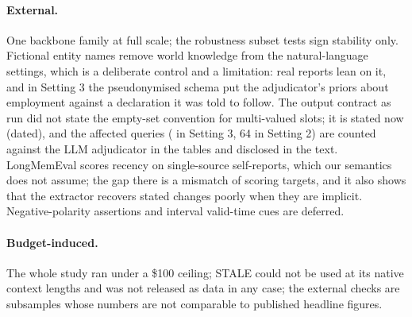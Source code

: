 \paragraph{External.} One backbone family at full scale; the robustness subset tests sign stability only. Fictional entity names remove world knowledge from the natural-language settings, which is a deliberate control and a limitation: real reports lean on it, and in Setting 3 the pseudonymised schema put the adjudicator's priors about employment against a declaration it was told to follow. The output contract as run did not state the empty-set convention for multi-valued slots; it is stated now (dated), and the affected queries (\sThreeEstEmpty{} in Setting 3, 64 in Setting 2) are counted against the LLM adjudicator in the tables and disclosed in the text. LongMemEval scores recency on single-source self-reports, which our semantics does not assume; the gap there is a mismatch of scoring targets, and it also shows that the extractor recovers stated changes poorly when they are implicit. Negative-polarity assertions and interval valid-time cues are deferred.
\paragraph{Budget-induced.} The whole study ran under a \$100 ceiling; STALE could not be used at its native context lengths and was not released as data in any case; the external checks are subsamples whose numbers are not comparable to published headline figures.
